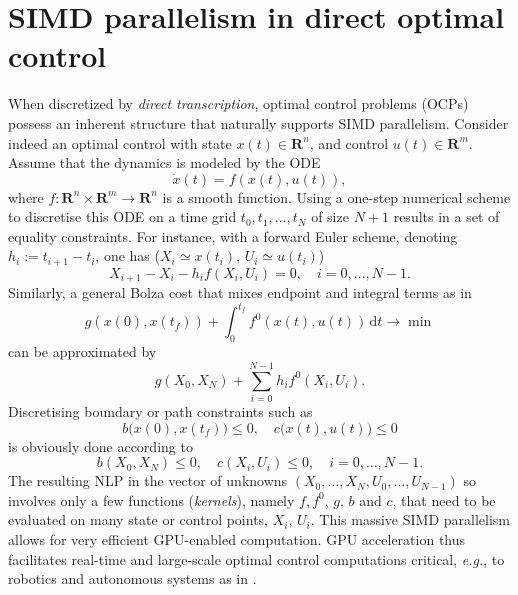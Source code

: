 \section{SIMD parallelism in direct optimal control} \label{s3}
When discretized by \emph{direct transcription}, optimal control problems (OCPs) possess an inherent structure that naturally supports SIMD parallelism. 
Consider indeed an optimal control with state $x(t) \in \mathbf{R}^n$, and control $u(t) \in \mathbf{R}^m$. Assume that the dynamics is modeled by the ODE
$$ \dot{x}(t) = f(x(t), u(t)), $$
where $f : \mathbf{R}^n \times \mathbf{R}^m \to \mathbf{R}^n$ is a smooth function. Using a one-step numerical scheme to discretise this ODE on a time grid $t_0, t_1, \dots, t_N$ of size $N + 1$ results in a set of equality constraints. For instance, with a forward Euler scheme, denoting $h_i := t_{i+1} - t_i$, one has ($X_i \simeq x(t_i)$, $U_i \simeq u(t_i)$)
$$ X_{i+1} - X_i - h_i f(X_i, U_i) = 0,\quad i = 0, \dots, N-1. $$
Similarly, a general Bolza cost that mixes endpoint and integral terms as in
$$ g(x(0), x(t_f)) + \int_0^{t_f} f^0(x(t), u(t))\,\mathrm{d}t \to \min $$
can be approximated by
$$ g(X_0, X_N) + \sum_{i=0}^{N-1} h_i f^0(X_i, U_i). $$
Discretising boundary or path constraints such as
$$ b\big(x(0),x(t_f)\big) \leq 0,\quad c\big(x(t), u(t)\big) \leq 0 $$
is obviously done according to
$$ b(X_0, X_N) \leq 0, \quad c(X_i, U_i) \leq 0,\quad i = 0, \dots, N-1. $$
The resulting NLP in the vector of unknowns $(X_0,\dots,X_N,U_0,\dots,U_{N-1})$
so involves only a few functions (\emph{kernels}), namely $f, f^0$, $g$, $b$ and $c$, that need to be evaluated on many state or control points, $X_i$, $U_i$.
This massive SIMD parallelism allows for very efficient GPU-enabled computation.
GPU acceleration thus facilitates real-time and large-scale optimal control computations critical, \emph{e.g.}, to robotics and autonomous systems as in \cite{pacaud2024gpu}.


